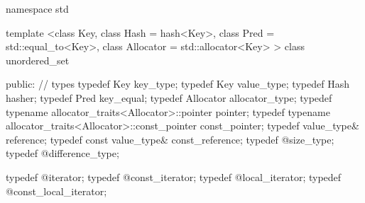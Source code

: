 %
\begin{codeblock}
namespace std {
  template <class Key,
            class Hash = hash<Key>,
            class Pred = std::equal_to<Key>,
            class Allocator = std::allocator<Key> >
  class unordered_set
  {
  public:
    // types
    typedef Key                                                 key_type;
    typedef Key                                                 value_type;
    typedef Hash                                                hasher;
    typedef Pred                                                key_equal;
    typedef Allocator                                           allocator_type;
    typedef typename allocator_traits<Allocator>::pointer       pointer;
    typedef typename allocator_traits<Allocator>::const_pointer const_pointer;
    typedef value_type&                                         reference;
    typedef const value_type&                                   const_reference;
    typedef @\impdef@                              size_type;
    typedef @\impdef@                              difference_type;

    typedef @\impdef@                              iterator;
    typedef @\impdef@                              const_iterator;
    typedef @\impdef@                              local_iterator;
    typedef @\impdef@                              const_local_iterator;

}}
\end{codeblock}
